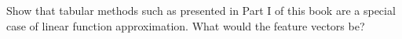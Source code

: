 
\begin{exercise}[Exercise 9.1]

Show that tabular methods such as presented in Part I of this book are
a special case of linear function approximation. What would the feature
vectors be?

\end{exercise}


\begin{solution}

\phantom{}

\end{solution}

